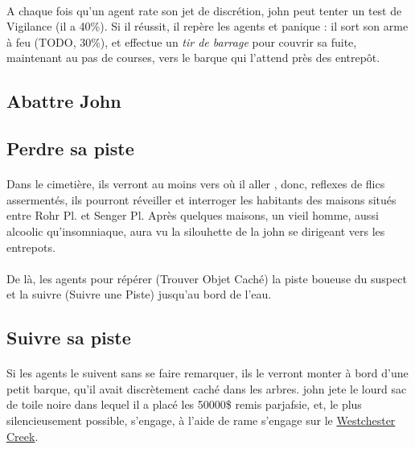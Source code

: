 \documentclass[a4paper,10pt]{article}
\begin{document}
\paragraph{} A chaque fois qu'un agent rate son jet de discrétion, \gls{john} peut tenter un test de Vigilance (il a 40\%). Si il réussit, il 
repère les agents et panique : il sort son arme à feu (TODO, 30\%), et effectue un \emph{tir de barrage} pour couvrir sa fuite, maintenant au 
pas de courses, vers le barque qui l'attend près des entrepôt.

\subsection{Abattre John}


\subsection{Perdre sa piste}

\paragraph{} Dans le cimetière, ils verront au moins vers où il aller , donc, reflexes de flics assermentés, ils pourront réveiller et interroger les 
habitants des maisons situés entre Rohr Pl. et Senger Pl. Après quelques maisons, un vieil homme, aussi alcoolic qu'insomniaque, aura vu la
silouhette de la \gls{john} se dirigeant vers les entrepots.

\paragraph{} De là, les agents pour répérer (Trouver Objet Caché) la piste boueuse du suspect et la suivre (Suivre une Piste) jusqu'au bord de 
l'eau.

\subsection{Suivre sa piste}

\paragraph{} Si les agents le suivent sans se faire remarquer, ils le verront monter à bord d'une petit barque, qu'il avait discrètement caché dans les 
arbres. \gls{john} jete le lourd sac de toile noire dans lequel il a placé les 50000\$ remis par\gls{jafsie}, et, le plus silencieusement possible, 
s'engage, à l'aide de rame s'engage sur le \href{http://en.wikipedia.org/wiki/Westchester\_Creek}{Westchester Creek}.
\end{document}
